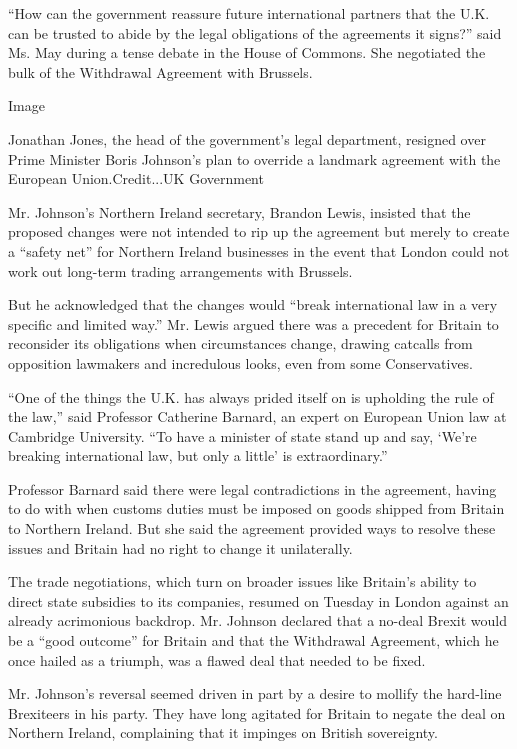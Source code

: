``How can the government reassure future international partners that the
U.K. can be trusted to abide by the legal obligations of the agreements
it signs?'' said Ms. May during a tense debate in the House of Commons.
She negotiated the bulk of the Withdrawal Agreement with Brussels.

Image

Jonathan Jones, the head of the government's legal department, resigned
over Prime Minister Boris Johnson's plan to override a landmark
agreement with the European Union.Credit...UK Government

Mr. Johnson's Northern Ireland secretary, Brandon Lewis, insisted that
the proposed changes were not intended to rip up the agreement but
merely to create a ``safety net'' for Northern Ireland businesses in the
event that London could not work out long-term trading arrangements with
Brussels.

But he acknowledged that the changes would ``break international law in
a very specific and limited way.'' Mr. Lewis argued there was a
precedent for Britain to reconsider its obligations when circumstances
change, drawing catcalls from opposition lawmakers and incredulous
looks, even from some Conservatives.

``One of the things the U.K. has always prided itself on is upholding
the rule of the law,'' said Professor Catherine Barnard, an expert on
European Union law at Cambridge University. ``To have a minister of
state stand up and say, `We're breaking international law, but only a
little' is extraordinary.''

Professor Barnard said there were legal contradictions in the agreement,
having to do with when customs duties must be imposed on goods shipped
from Britain to Northern Ireland. But she said the agreement provided
ways to resolve these issues and Britain had no right to change it
unilaterally.

The trade negotiations, which turn on broader issues like Britain's
ability to direct state subsidies to its companies, resumed on Tuesday
in London against an already acrimonious backdrop. Mr. Johnson declared
that a no-deal Brexit would be a ``good outcome'' for Britain and that
the Withdrawal Agreement, which he once hailed as a triumph, was a
flawed deal that needed to be fixed.

Mr. Johnson's reversal seemed driven in part by a desire to mollify the
hard-line Brexiteers in his party. They have long agitated for Britain
to negate the deal on Northern Ireland, complaining that it impinges on
British sovereignty.

